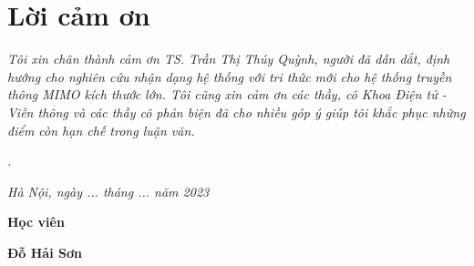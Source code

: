 \clearpage
{}

\chapter*{Lời cảm ơn}

\textit{Tôi xin chân thành cảm ơn TS. Trần Thị Thúy Quỳnh, người đã dẫn dắt, định hướng cho nghiên cứu nhận dạng hệ thống với tri thức mới cho hệ thống truyền thông MIMO kích thước lớn. Tôi cũng xin cảm ơn các thầy, cô Khoa Điện tử - Viễn thông và các thầy cô phản biện đã cho nhiều góp ý giúp tôi khắc phục những điểm còn hạn chế trong luận văn.}

\textit{.}

\vspace{1cm}
\hspace{7cm}\textit{Hà Nội, ngày ... tháng ... năm 2023}

\hspace{9.4cm}\textbf{Học viên}
\vspace{2.5cm}


\hspace{9.3cm}\textbf{Đỗ Hải Sơn}